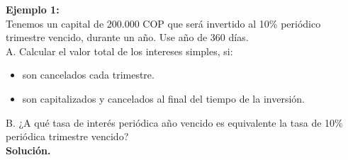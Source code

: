 \textbf{Ejemplo 1:}\\
Tenemos un capital de 200{.}000 COP que será invertido al 10\% 
periódico trimestre vencido, durante un año. Use año de 360 días. \\

A. Calcular el valor total de los intereses simples, si:
\begin{itemize}
  \item son cancelados cada trimestre.
  \item son capitalizados y cancelados al final del tiempo de la inversión.
\end{itemize}
B. ¿A qué tasa de interés periódica año vencido es equivalente la tasa de 10\% 
periódica trimestre vencido?\\


\textbf{Solución.}

